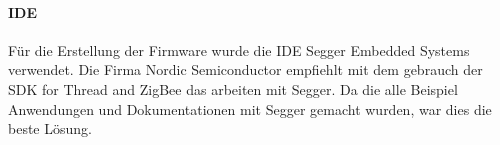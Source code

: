 \paragraph{IDE}
Für die Erstellung der Firmware wurde die IDE Segger Embedded Systems verwendet. Die Firma Nordic Semiconductor empfiehlt mit dem gebrauch der SDK for Thread and ZigBee das arbeiten mit Segger. Da die alle Beispiel Anwendungen und Dokumentationen mit Segger gemacht wurden, war dies die beste Lösung.

